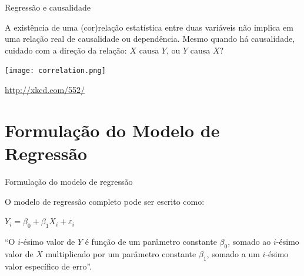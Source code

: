 \documentclass{beamer}\usepackage[]{graphicx}\usepackage[]{color}
\begin{document}
\begin{frame}{Regressão e causalidade}

A existência de uma (cor)relação estatística entre duas variáveis não implica em uma relação real de causalidade ou dependência.
\vfill
Mesmo quando há causalidade, cuidado com a direção da relação: $X$ causa $Y$, ou $Y$ causa $X$?
\vfill
\begin{center}
\texttt{[image: correlation.png]}

\tiny{\url{http://xkcd.com/552/}}
\end{center}

\end{frame}

\section{Formulação do Modelo de Regressão}


\begin{frame}{Formulação do modelo de regressão}

O modelo de regressão completo pode ser escrito como:
\vfill
\begin{center}
$Y_i=\beta _0 + \beta _1 X_i + \varepsilon _i$
\end{center}
\vfill
``O $i$-ésimo valor de $Y$ é função de um parâmetro constante $\beta _0$, somado ao $i$-ésimo valor de $X$ multiplicado por um parâmetro constante $\beta _1$, somado a um $i$-ésimo valor específico de erro''.

\end{frame}
\end{document}
